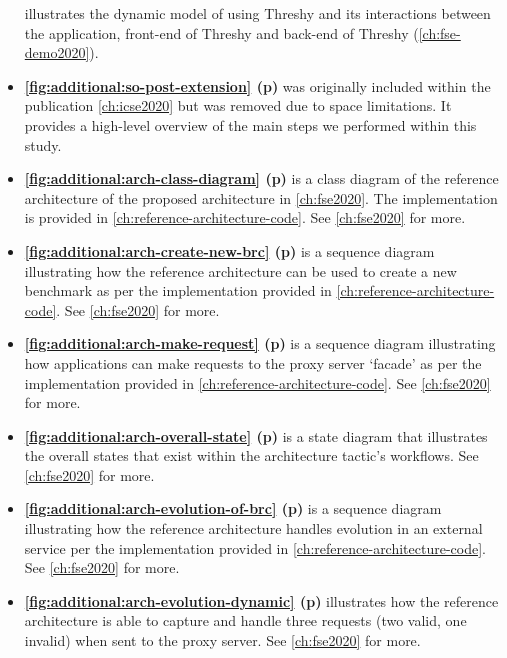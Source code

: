 \begin{itemize}[leftmargin=0mm]
  illustrates the dynamic model of using Threshy and its interactions between the application, front-end of Threshy and back-end of Threshy (\cref{ch:fse-demo2020}).
\item \textbf{\cref{fig:additional:so-post-extension} (p\pageref{fig:additional:so-post-extension})}
  was originally included within the publication \cref{ch:icse2020} but was removed due to space limitations. It provides a high-level overview of the main steps we performed within this study.
\item \textbf{\cref{fig:additional:arch-class-diagram} (p\pageref{fig:additional:arch-class-diagram})}
  is a class diagram of the reference architecture of the proposed architecture in \cref{ch:fse2020}. The implementation is provided in \cref{ch:reference-architecture-code}. See \cref{ch:fse2020} for more.
\item \textbf{\cref{fig:additional:arch-create-new-brc} (p\pageref{fig:additional:arch-create-new-brc})}
  is a sequence diagram illustrating how the reference architecture can be used to create a new benchmark as per the implementation provided in \cref{ch:reference-architecture-code}. See \cref{ch:fse2020} for more.
\item \textbf{\cref{fig:additional:arch-make-request} (p\pageref{fig:additional:arch-make-request})}
  is a sequence diagram illustrating how applications can make requests to the proxy server `facade' as per the implementation provided in \cref{ch:reference-architecture-code}. See \cref{ch:fse2020} for more.
\item \textbf{\cref{fig:additional:arch-overall-state} (p\pageref{fig:additional:arch-overall-state})}
  is a state diagram that illustrates the overall states that exist within the architecture tactic's workflows. See \cref{ch:fse2020} for more.
\item \textbf{\cref{fig:additional:arch-evolution-of-brc} (p\pageref{fig:additional:arch-evolution-of-brc})}
  is a sequence diagram illustrating how the reference architecture handles evolution in an external service per the implementation provided in \cref{ch:reference-architecture-code}. See \cref{ch:fse2020} for more.
\item \textbf{\cref{fig:additional:arch-evolution-dynamic} (p\pageref{fig:additional:arch-evolution-dynamic})}
  illustrates how the reference architecture is able to capture and handle three requests (two valid, one invalid) when sent to the proxy server. See \cref{ch:fse2020} for more.
\end{itemize}

